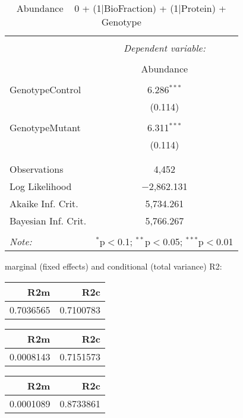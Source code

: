 \documentclass[11pt]{report}
\begin{document}
\begin{table}[!htbp] \centering 
  \caption{Abundance ~ 0 + (1|BioFraction) + (1|Protein) + Genotype} 
  \label{} 
\begin{tabular}{@{\extracolsep{5pt}}lc} 
\\[-1.8ex]\hline 
\hline \\[-1.8ex] 
 & \multicolumn{1}{c}{\textit{Dependent variable:}} \\ 
\cline{2-2} 
\\[-1.8ex] & Abundance \\ 
\hline \\[-1.8ex] 
 GenotypeControl & 6.286$^{***}$ \\ 
  & (0.114) \\ 
  & \\ 
 GenotypeMutant & 6.311$^{***}$ \\ 
  & (0.114) \\ 
  & \\ 
\hline \\[-1.8ex] 
Observations & 4,452 \\ 
Log Likelihood & $-$2,862.131 \\ 
Akaike Inf. Crit. & 5,734.261 \\ 
Bayesian Inf. Crit. & 5,766.267 \\ 
\hline 
\hline \\[-1.8ex] 
\textit{Note:}  & \multicolumn{1}{r}{$^{*}$p$<$0.1; $^{**}$p$<$0.05; $^{***}$p$<$0.01} \\ 
\end{tabular} 
\end{table} 
marginal (fixed effects) and conditional (total variance) R2:

\begin{tabular}{r|r}
\hline
R2m & R2c\\
\hline
0.7036565 & 0.7100783\\
\hline
\end{tabular}

\begin{tabular}{r|r}
\hline
R2m & R2c\\
\hline
0.0008143 & 0.7151573\\
\hline
\end{tabular}

\begin{tabular}{r|r}
\hline
R2m & R2c\\
\hline
0.0001089 & 0.8733861\\
\hline
\end{tabular}
\end{document}
